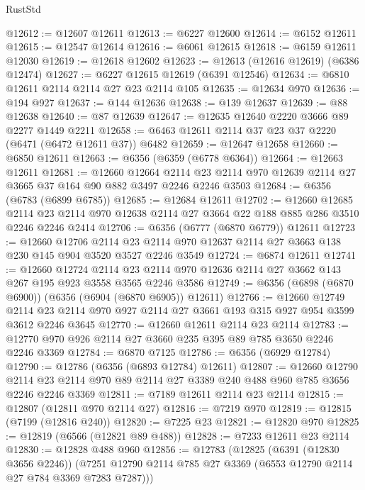 \begin{lexlean}{RustStd}
\begin{coremodule}
@12612 := @12607 @12611
@12613 := @6227 @12600
@12614 := @6152 @12611
@12615 := @12547 @12614
@12616 := @6061 @12615
@12618 := @6159 @12611 @12030
@12619 := @12618 @12602
@12623 := @12613 (@12616 @12619) (@6386 @12474)
@12627 := @6227 @12615 @12619 (@6391 @12546)
@12634 := @6810 @12611 @2114 @2114 @27 @23 @2114 @105
@12635 := @12634 @970
@12636 := @194 @927
@12637 := @144 @12636
@12638 := @139 @12637
@12639 := @88 @12638
@12640 := @87 @12639
@12647 := @12635 @12640 @2220 @3666 @89 @2277 @1449 @2211
@12658 := @6463 @12611 @2114 @37 @23 @37 @2220 (@6471 (@6472 @12611 @37)) @6482
@12659 := @12647 @12658
@12660 := @6850 @12611
@12663 := @6356 (@6359 (@6778 @6364))
@12664 := @12663 @12611
@12681 := @12660
    @12664
    @2114
    @23
    @2114
    @970
    @12639
    @2114
    @27
    @3665
    @37
    @164
    @90
    @882
    @3497
    @2246
    @2246
    @3503
@12684 := @6356 (@6783 (@6899 @6785))
@12685 := @12684 @12611
@12702 := @12660
    @12685
    @2114
    @23
    @2114
    @970
    @12638
    @2114
    @27
    @3664
    @22
    @188
    @885
    @286
    @3510
    @2246
    @2246
    @2414
@12706 := @6356 (@6777 (@6870 @6779)) @12611
@12723 := @12660
    @12706
    @2114
    @23
    @2114
    @970
    @12637
    @2114
    @27
    @3663
    @138
    @230
    @145
    @904
    @3520
    @3527
    @2246
    @3549
@12724 := @6874 @12611
@12741 := @12660
    @12724
    @2114
    @23
    @2114
    @970
    @12636
    @2114
    @27
    @3662
    @143
    @267
    @195
    @923
    @3558
    @3565
    @2246
    @3586
@12749 := @6356 (@6898 (@6870 @6900)) (@6356 (@6904 (@6870 @6905)) @12611)
@12766 := @12660
    @12749
    @2114
    @23
    @2114
    @970
    @927
    @2114
    @27
    @3661
    @193
    @315
    @927
    @954
    @3599
    @3612
    @2246
    @3645
@12770 := @12660 @12611 @2114 @23 @2114
@12783 := @12770 @970 @926 @2114 @27 @3660 @235 @395 @89 @785 @3650 @2246 @2246 @3369
@12784 := @6870 @7125
@12786 := @6356 (@6929 @12784)
@12790 := @12786 (@6356 (@6893 @12784) @12611)
@12807 := @12660
    @12790
    @2114
    @23
    @2114
    @970
    @89
    @2114
    @27
    @3389
    @240
    @488
    @960
    @785
    @3656
    @2246
    @2246
    @3369
@12811 := @7189 @12611 @2114 @23 @2114
@12815 := @12807 (@12811 @970 @2114 @27)
@12816 := @7219 @970
@12819 := @12815 (@7199 (@12816 @240))
@12820 := @7225 @23
@12821 := @12820 @970
@12825 := @12819 (@6566 (@12821 @89 @488))
@12828 := @7233 @12611 @23 @2114
@12830 := @12828 @488 @960
@12856 := @12783
    (@12825
      (@6391 (@12830 @3656 @2246))
      (@7251 @12790 @2114 @785 @27 @3369 (@6553 @12790 @2114 @27 @784 @3369 @7283 @7287)))

\end{coremodule}
\end{lexlean}
